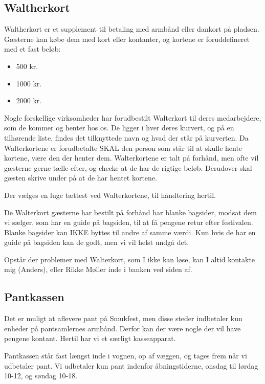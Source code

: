\subsection{Waltherkort}
Waltherkort er et supplement til betaling med armbånd eller dankort på pladsen.
Gæsterne kan købe dem med kort eller kontanter, og kortene er foruddefineret med et fast beløb:
\begin{itemize}
  \item 500 kr.
  \item 1000 kr.
  \item 2000 kr.
\end{itemize} 

Nogle forskellige virksomheder har forudbestilt Walterkort til deres medarbejdere, 
som de kommer og henter hos os. 
De ligger i hver deres kurvert, og på en tilhørende liste, findes det tilknyttede navn 
og hvad der står på kurverten.
Da Walterkortene er forudbetalte SKAL den person 
som står til at skulle hente kortene, være den der henter dem.
Walterkortene er talt på forhånd, men ofte vil gæsterne gerne tælle efter, 
og checke at de har de rigtige beløb.
Derudover skal gæsten skrive under på at de har hentet kortene.

Der vælges en luge tættest ved Walterkortene, til håndtering hertil.

De Walterkort gæsterne har bestilt på forhånd har blanke bagsider, modsat dem vi sælger,
som har en guide på bagsiden, til at få pengene retur efter festivalen.
Blanke bagsider kan IKKE byttes til andre af samme værdi. Kun hvis de har en guide på bagsiden 
kan de godt, men vi vil helst undgå det.

Opstår der problemer med Walterkort, som I ikke kan løse, kan I altid kontakte mig (Anders), eller Rikke Møller 
inde i banken ved siden af. 

\subsection{Pantkassen}

Det er muligt at aflevere pant på Smukfest, men disse steder indbetaler kun enheder på pantsamlernes armbånd.
Derfor kan der være nogle der vil have pengene kontant. Hertil har vi et særligt kasseapparat.

Pantkassen står fast længst inde i vognen, op af væggen, og tages frem når vi udbetaler pant.
Vi udbetaler kun pant indenfor åbningstiderne, onsdag til lørdag 10-12, og søndag 10-18.

